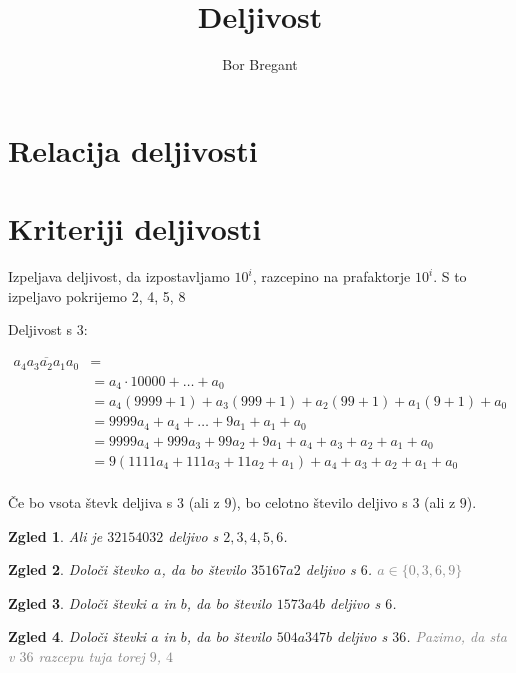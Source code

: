 \documentclass{article}
\title{Deljivost}
\author{Bor Bregant}
\date{\vspace{-5ex}}
\newtheorem*{zgled}{Zgled}
\begin{document}
\maketitle

\section{Relacija deljivosti}


\section{Kriteriji deljivosti}

Izpeljava deljivost, da izpostavljamo $10^i$, razcepino na prafaktorje $10^i$. S to izpeljavo pokrijemo 2, 4, 5, 8

Deljivost s $3$:

\begin{align*}
\overline{a_4 a_3 a_2 a_1 a_0} &=\\
 &=a_4 \cdot 10000 + \ldots + a_0\\
 &=a_4 (9999+1)+a_3(999+1)+a_2(99+1)+a_1(9+1)+a_0\\
 &=9999a_4 + a_4 + \ldots + 9a_1 +a_1 +a_0\\
 &=9999a_4+999a_3+99a_2+9a_1 +a_4+a_3+a_2+a_1+a_0\\
 &=9(1111a_4 +111a_3+11a_2+a_1)+a_4+a_3+a_2+a_1+a_0\\
\end{align*}

Če bo vsota števk deljiva s $3$ (ali z $9$), bo celotno število deljivo s $3$ (ali z $9$).

\begin{zgled}
    Ali je $32154032$ deljivo s $2,3,4,5,6$.
\end{zgled}

\begin{zgled}
    Določi števko $a$, da bo število $35167a2$ deljivo s $6$. \textcolor{gray}{$a\in\{0,3,6,9\}$}
\end{zgled}

\begin{zgled}
    Določi števki $a$ in $b$, da bo število $1573a4b$ deljivo s $6$.
\end{zgled}

\begin{zgled}
    Določi števki $a$ in $b$, da bo število $504a347b$ deljivo s $36$. \textcolor{gray}{Pazimo, da sta v $36$ razcepu tuja torej $9$, $4$}
\end{zgled}
\end{document}
